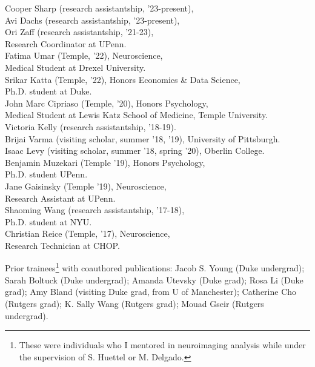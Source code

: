 \documentclass[11pt, letterpaper]{article}
\begin{document}
\begin{tabbing}
\> Cooper Sharp (research assistantship, '23-present), \\
\> Avi Dachs (research assistantship, '23-present), \\
\> Ori Zaff (research assistantship, '21-23), \\
\> \> Research Coordinator at UPenn. \\
\> Fatima Umar (Temple, '22), Neuroscience, \\
\> \> Medical Student at Drexel University. \\
\> Srikar Katta (Temple, '22), Honors Economics \& Data Science, \\
\> \> Ph.D. student at Duke. \\
\> John Marc Cipriaso (Temple, '20), Honors Psychology, \\
\> \> Medical Student at Lewis Katz School of Medicine, Temple University. \\
\> Victoria Kelly (research assistantship, '18-19). \\
\> Brijai Varma (visiting scholar, summer '18, '19), University of Pittsburgh. \\
\> Isaac Levy (visiting scholar, summer '18, spring '20), Oberlin College. \\
\> Benjamin Muzekari (Temple '19), Honors Psychology, \\
\> \> Ph.D. student UPenn. \\
\> Jane Gaisinsky (Temple '19), Neuroscience, \\
\> \> Research Assistant at UPenn. \\
\> Shaoming Wang (research assistantship, '17-18), \\
\> \> Ph.D. student at NYU. \\
\> Christian Reice (Temple, '17), Neuroscience, \\
\> \> Research Technician at CHOP.

\end{tabbing}

\begin{hangparas}{.5in}{1}
Prior trainees\footnote{These were individuals who I mentored in neuroimaging analysis while under the supervision of S. Huettel or M. Delgado.} with coauthored publications: Jacob S. Young (Duke undergrad); Sarah Boltuck (Duke undergrad); Amanda Utevsky (Duke grad); Rosa Li (Duke grad); Amy Bland (visiting Duke grad, from U of Manchester); Catherine Cho (Rutgers grad); K. Sally Wang (Rutgers grad); Mouad Gseir (Rutgers undergrad).
\end{hangparas}
\end{document}
